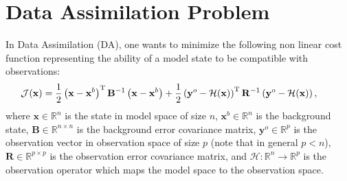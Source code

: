\documentclass[npg, manuscript]{copernicus}
\begin{document}
\section{Data Assimilation Problem}
In Data Assimilation (DA), one wants to minimize the following non linear cost function representing the ability of a model state to be compatible with observations:
\begin{align}
\hspace{-0.7cm} \mathcal{J}(\mathbf{x}) = \frac{1}{2} \left(\mathbf{x}-\mathbf{x}^b\right)^\mathrm{T} \mathbf{B}^{-1} \left(\mathbf{x}-\mathbf{x}^b\right) + \frac{1}{2} \left(\mathbf{y}^o-\mathcal{H}(\mathbf{x})\right)^\mathrm{T} \mathbf{R}^{-1} \left(\mathbf{y}^o-\mathcal{H}(\mathbf{x})\right),
\end{align}
where $\mathbf{x} \in \mathbb{R}^n$ is the state in model space of size $n$, $\mathbf{x}^b \in \mathbb{R}^n$ is the background state, $\mathbf{B} \in \mathbb{R}^{n \times n}$ is the background error covariance matrix, $\mathbf{y}^o \in \mathbb{R}^p$ is the observation vector  in observation space of size $p$ (note that in general $p<n$), $\mathbf{R} \in \mathbb{R}^{p \times p}$ is the observation error covariance matrix, and $\mathcal{H} : \mathbb{R}^n \rightarrow \mathbb{R}^p$ is the observation operator which maps the model space to the observation space. 
\end{document}
